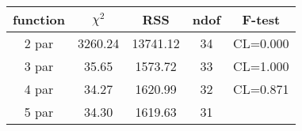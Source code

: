\begin{tabular}{c|c|c|c|c}
function & $\chi^2$ & RSS & ndof & F-test \\
\hline
2 par & 3260.24 & 13741.12 & 34 & CL=0.000 \\
3 par & 35.65 & 1573.72 & 33 & CL=1.000 \\
4 par & 34.27 & 1620.99 & 32 & CL=0.871 \\
5 par & 34.30 & 1619.63 & 31 & \\
\hline
\end{tabular}